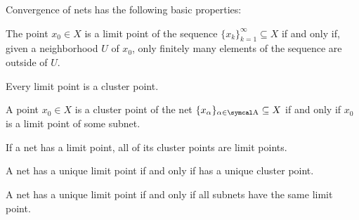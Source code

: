 \begin{proposition}\label{thm:net_convergence_properties}
  Convergence of nets has the following basic properties:

  \begin{propenum}
     The point \( x_0 \in X \) is a limit point of the sequence \( \{ x_k \}_{k=1}^\infty \subseteq X \) if and only if, given a neighborhood \( U \) of \( x_0 \), only finitely many elements of the sequence are outside of \( U \).

     Every limit point is a cluster point.

     A point \( x_0 \in X \) is a cluster point of the net \( \{ x_\al \}_{\al \in \CA} \subseteq X \) if and only if \( x_0 \) is a limit point of some subnet.

     If a net has a limit point, all of its cluster points are limit points.

     A net has a unique limit point if and only if has a unique cluster point.

     A net has a unique limit point if and only if all subnets have the same limit point.
  \end{propenum}
\end{proposition}
